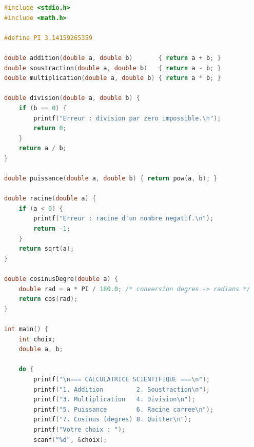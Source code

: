 \documentclass[11pt]{article}
\begin{document}
\begin{corrige}
\begin{lstlisting}[language=C]
#include <stdio.h>
#include <math.h>

#define PI 3.14159265359

double addition(double a, double b)       { return a + b; }
double soustraction(double a, double b)   { return a - b; }
double multiplication(double a, double b) { return a * b; }

double division(double a, double b) {
    if (b == 0) {
        printf("Erreur : division par zero impossible.\n");
        return 0;
    }
    return a / b;
}

double puissance(double a, double b) { return pow(a, b); }

double racine(double a) {
    if (a < 0) {
        printf("Erreur : racine d'un nombre negatif.\n");
        return -1;
    }
    return sqrt(a);
}

double cosinusDegre(double a) {
    double rad = a * PI / 180.0; /* conversion degres -> radians */
    return cos(rad);
}

int main() {
    int choix;
    double a, b;

    do {
        printf("\n=== CALCULATRICE SCIENTIFIQUE ===\n");
        printf("1. Addition         2. Soustraction\n");
        printf("3. Multiplication   4. Division\n");
        printf("5. Puissance        6. Racine carree\n");
        printf("7. Cosinus (degres) 8. Quitter\n");
        printf("Votre choix : ");
        scanf("%d", &choix);


\end{lstlisting}
\end{corrige}
\end{document}
